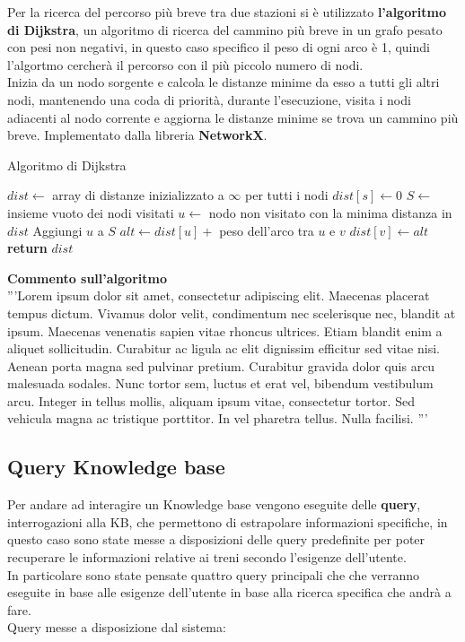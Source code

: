 \documentclass[italian,12pt,a4paper]{article}
\begin{document}
		Per la ricerca del percorso più breve tra due stazioni si è utilizzato \textbf{l'algoritmo di Dijkstra}, un algoritmo di ricerca del cammino più breve in un grafo pesato con pesi non negativi, in questo caso specifico il peso di ogni arco è 1, quindi l'algortmo cercherà il percorso con il più piccolo numero di nodi.\\
		\linebreak
		Inizia da un nodo sorgente e calcola le distanze minime da esso a tutti gli altri nodi, mantenendo una coda di priorità, durante l'esecuzione, visita i nodi adiacenti al nodo corrente e aggiorna le distanze minime se trova un cammino più breve. Implementato dalla libreria \textbf{NetworkX}.
		
	\begin{algorithm}
		\caption{Algoritmo di Dijkstra}
		\begin{algorithmic}[1]
			\State $dist \gets$ array di distanze inizializzato a $\infty$ per tutti i nodi
			\State $dist[s] \gets 0$
			\State $S \gets$ insieme vuoto dei nodi visitati
			\State $u \gets$ nodo non visitato con la minima distanza in $dist$
			\State Aggiungi $u$ a $S$
			\State $alt \gets dist[u] +$ peso dell'arco tra $u$ e $v$
			\State $dist[v] \gets alt$
			\EndIf
			\EndFor
			\EndWhile
			\State \textbf{return} $dist$ 
			\EndProcedure
		\end{algorithmic}
	\end{algorithm}

	\textbf{Commento sull'algoritmo} \\
	'''Lorem ipsum dolor sit amet, consectetur adipiscing elit. Maecenas placerat tempus dictum. Vivamus dolor velit, condimentum nec scelerisque nec, blandit at ipsum. Maecenas venenatis sapien vitae rhoncus ultrices. Etiam blandit enim a aliquet sollicitudin. Curabitur ac ligula ac elit dignissim efficitur sed vitae nisi. Aenean porta magna sed pulvinar pretium. Curabitur gravida dolor quis arcu malesuada sodales. Nunc tortor sem, luctus et erat vel, bibendum vestibulum arcu. Integer in tellus mollis, aliquam ipsum vitae, consectetur tortor. Sed vehicula magna ac tristique porttitor. In vel pharetra tellus. Nulla facilisi. '''

	\subsection{Query Knowledge base}
	Per andare ad interagire un Knowledge base vengono eseguite delle \textbf{query}, interrogazioni alla KB, che permettono di estrapolare informazioni specifiche, in questo caso sono state messe a disposizioni delle query predefinite per poter recuperare le informazioni relative ai treni secondo l'esigenze dell'utente. \\
	\linebreak
	In particolare sono state pensate quattro query principali che che verranno eseguite in base alle esigenze dell'utente in base alla ricerca specifica che andrà a fare.\\
	\linebreak
	Query messe a disposizione dal sistema: \\
	
\end{document}
